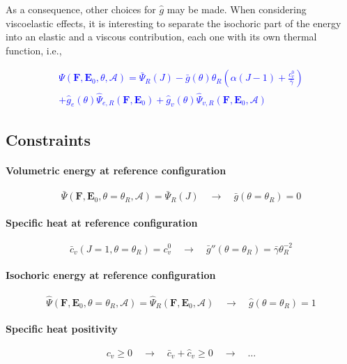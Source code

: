 \documentclass[a4paper,12pt]{article}
\newcommand{\A}{\mathcal{A}}
\newcommand{\E}{\mathbf{E}}
\newcommand{\F}{\mathbf{F}}
\newcommand{\0}{\mathbf{0}}
\begin{document}
As a consequence, other choices for $\hat{g}$ may be made. When considering viscoelastic effects, it is interesting to separate the isochoric part of the energy into an elastic and a viscous contribution, each one with its own thermal function, i.e.,

\textcolor{blue}{
\addtocounter{equation}{-1}
\begin{multline}
    \Psi(\F,\E_0,\theta,\A) = \bar{\Psi}_R(J) - \bar{g}(\theta) \theta_R
        \left(\alpha(J - 1) + \frac{c_v^0}{\bar\gamma}\right) \\
    + \hat{g}_e(\theta) \hat{\Psi}_{e,R}(\F,\E_0)
    + \hat{g}_v(\theta) \hat{\Psi}_{v,R}(\F,\E_0,\A)
\end{multline}
}


\subsection{Constraints}

\paragraph{Volumetric energy at reference configuration}
\begin{equation*}
  \bar{\Psi}(\F,\E_0,\theta=\theta_R,\A) = \bar{\Psi}_R(J) \quad \rightarrow \quad \bar{g}(\theta=\theta_R) = 0
\end{equation*}

\paragraph{Specific heat at reference configuration}
\begin{equation*}
  \bar{c}_v(J=1,\theta=\theta_R) = c_v^0 \quad \rightarrow \quad \bar{g}''(\theta=\theta_R) = \bar{\gamma}\theta_R^{-2}
\end{equation*}

\paragraph{Isochoric energy at reference configuration}
\begin{equation*}
  \hat{\Psi}(\F,\E_0,\theta=\theta_R,\A) = \hat{\Psi}_R(\F,\E_0,\A) \quad \rightarrow \quad \hat{g}(\theta=\theta_R) = 1
\end{equation*}

\paragraph{Specific heat positivity}
\begin{equation*}
  c_v \geq 0 \quad \rightarrow \quad \bar{c}_v + \hat{c}_v \geq 0 \quad \rightarrow \quad \dots
\end{equation*}
\end{document}
